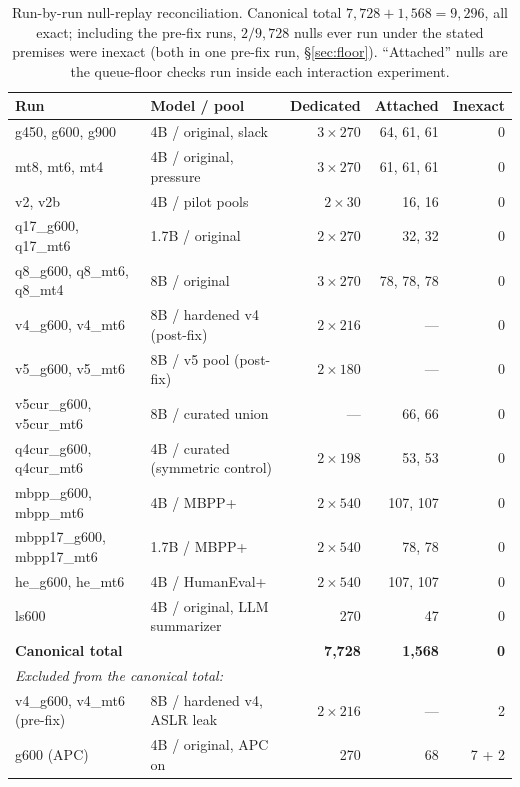 \documentclass{article}
\theoremstyle{remark}
\begin{document}
\begin{table}[h]
\centering\scriptsize
\begin{tabular}{llrrr}
\toprule
Run & Model / pool & Dedicated & Attached & Inexact \\
\midrule
g450, g600, g900 & 4B / original, slack & $3\times270$ & 64, 61, 61 & 0 \\
mt8, mt6, mt4 & 4B / original, pressure & $3\times270$ & 61, 61, 61 & 0 \\
v2, v2b & 4B / pilot pools & $2\times30$ & 16, 16 & 0 \\
q17\_g600, q17\_mt6 & 1.7B / original & $2\times270$ & 32, 32 & 0 \\
q8\_g600, q8\_mt6, q8\_mt4 & 8B / original & $3\times270$ & 78, 78, 78 & 0 \\
v4\_g600, v4\_mt6 & 8B / hardened v4 (post-fix) & $2\times216$ & --- & 0 \\
v5\_g600, v5\_mt6 & 8B / v5 pool (post-fix) & $2\times180$ & --- & 0 \\
v5cur\_g600, v5cur\_mt6 & 8B / curated union & --- & 66, 66 & 0 \\
q4cur\_g600, q4cur\_mt6 & 4B / curated (symmetric control) & $2\times198$ & 53, 53 & 0 \\
mbpp\_g600, mbpp\_mt6 & 4B / MBPP+ & $2\times540$ & 107, 107 & 0 \\
mbpp17\_g600, mbpp17\_mt6 & 1.7B / MBPP+ & $2\times540$ & 78, 78 & 0 \\
he\_g600, he\_mt6 & 4B / HumanEval+ & $2\times540$ & 107, 107 & 0 \\
ls600 & 4B / original, LLM summarizer & 270 & 47 & 0 \\
\midrule
\textbf{Canonical total} & & \textbf{7{,}728} & \textbf{1{,}568} & \textbf{0} \\
\midrule
\multicolumn{5}{l}{\emph{Excluded from the canonical total:}} \\
v4\_g600, v4\_mt6 (pre-fix) & 8B / hardened v4, ASLR leak & $2\times216$ & --- & 2 \\
g600 (APC) & 4B / original, APC on & 270 & 68 & 7 + 2 \\
\bottomrule
\end{tabular}
\caption{Run-by-run null-replay reconciliation. Canonical total
$7{,}728 + 1{,}568 = 9{,}296$, all exact; including the pre-fix runs,
$2/9{,}728$ nulls ever run under the stated premises were inexact (both in
one pre-fix run, \S\ref{sec:floor}). ``Attached'' nulls are the queue-floor
checks run inside each interaction experiment.}
\label{tab:nulls}
\end{table}
\end{document}
